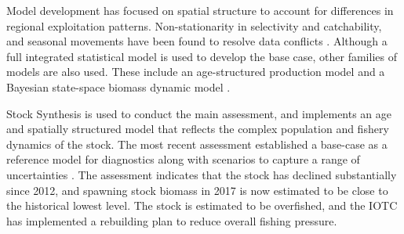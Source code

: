\documentclass[12pt,halfline,a4paper,nonumbib]{ouparticle}
\begin{document}
Model development has focused on spatial structure to account for differences in regional exploitation patterns. Non-stationarity in selectivity and catchability, and seasonal movements have been found to resolve data conflicts  \parencite{urtizberea2018yft}. Although a full integrated statistical model is used to develop the base case, other families of models are also used.  These include  an age-structured production model \parencite[ASPM,][]{maunder2015contemporary} and a Bayesian state-space biomass dynamic model \parencite[JABBA,][]{winker2018jabba}. 

Stock Synthesis \parencite[SS,][]{methot2013stock} is used to conduct the main assessment, and implements an age and spatially structured model that reflects the complex population and fishery dynamics of the stock. The most recent assessment established a base-case as a reference model for diagnostics along with scenarios to capture a range of uncertainties \parencite{fu2018yft}. The assessment indicates that the stock  has declined substantially since 2012, and spawning stock biomass in 2017 is now estimated to be close to the historical lowest level. The stock is estimated to be overfished, and the IOTC has implemented a rebuilding plan to reduce overall fishing pressure.  

\end{document}
